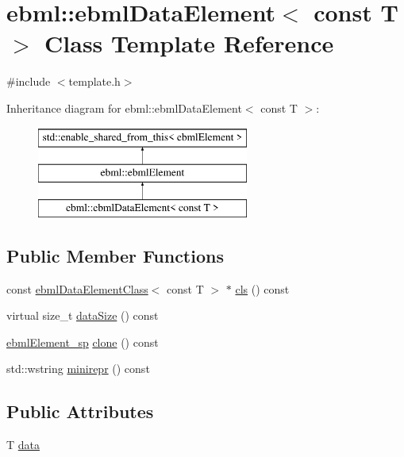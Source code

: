\hypertarget{classebml_1_1ebmlDataElement_3_01const_01T_01_4}{}\section{ebml\+:\+:ebml\+Data\+Element$<$ const T $>$ Class Template Reference}
\label{classebml_1_1ebmlDataElement_3_01const_01T_01_4}


{\ttfamily \#include $<$template.\+h$>$}

Inheritance diagram for ebml\+:\+:ebml\+Data\+Element$<$ const T $>$\+:\begin{figure}[H]
\begin{center}
\leavevmode
\includegraphics[height=3.000000cm]{classebml_1_1ebmlDataElement_3_01const_01T_01_4}
\end{center}
\end{figure}
\subsection*{Public Member Functions}
\begin{DoxyCompactItemize}
\item 
const \mbox{\hyperlink{classebml_1_1ebmlDataElementClass}{ebml\+Data\+Element\+Class}}$<$ const T $>$ $\ast$ \mbox{\hyperlink{classebml_1_1ebmlDataElement_3_01const_01T_01_4_a27173a9d7784ce0cfca71e1c72c36ec7}{cls}} () const
\item 
virtual size\+\_\+t \mbox{\hyperlink{classebml_1_1ebmlDataElement_3_01const_01T_01_4_a0965d2da67f1862d2c806151063dcfce}{data\+Size}} () const
\item 
\mbox{\hyperlink{namespaceebml_adad533b7705a16bb360fe56380c5e7be}{ebml\+Element\+\_\+sp}} \mbox{\hyperlink{classebml_1_1ebmlDataElement_3_01const_01T_01_4_a23f7032682dfdf20ce042caf144e50d6}{clone}} () const
\item 
std\+::wstring \mbox{\hyperlink{classebml_1_1ebmlDataElement_3_01const_01T_01_4_aa5a82c4528609bf788caf8db8927fbc1}{minirepr}} () const
\end{DoxyCompactItemize}
\subsection*{Public Attributes}
\begin{DoxyCompactItemize}
\item 
T \mbox{\hyperlink{classebml_1_1ebmlDataElement_3_01const_01T_01_4_ac3870bb3b5d9d0e3063a80768fe83904}{data}}
\end{DoxyCompactItemize}
